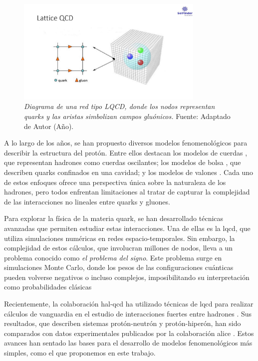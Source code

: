 \begin{figure}[h]
    \centering
    \includegraphics[width=0.8\textwidth]{./Images/LQCD.jpg}
    \caption[Red LQCD]{\emph{Diagrama de una red tipo LQCD, donde los nodos representan quarks y las aristas simbolizan campos gluónicos.} Fuente: Adaptado de Autor (Año).}
    \label{fig:LQCD }
\end{figure}

A lo largo de los años, se han propuesto diversos modelos fenomenológicos para describir la estructura del protón. Entre ellos destacan los modelos de cuerdas \cite{Artru1974, Andersson_1983}, que representan hadrones como cuerdas oscilantes; los modelos de bolsa \cite{AIHPA_1968__8_2_163_0,DeTar_1983}, que describen quarks confinados en una cavidad; y los modelos de valones \cite{Hwa_1981}. Cada uno de estos enfoques ofrece una perspectiva única sobre la naturaleza de los hadrones, pero todos enfrentan limitaciones al tratar de capturar la complejidad de las interacciones no lineales entre quarks y gluones.

Para explorar la física de la materia quark, se han desarrollado técnicas avanzadas que permiten estudiar estas interacciones. Una de ellas es la \acrfull{lqcd}, que utiliza simulaciones numéricas en redes espacio-temporales. Sin embargo, la complejidad de estos cálculos, que involucran millones de nodos, lleva a un problema conocido como \emph{el problema del signo}. Este problema surge en simulaciones Monte Carlo, donde los pesos de las configuraciones cuánticas pueden volverse negativos o incluso complejos, imposibilitando su interpretación como probabilidades clásicas %

Recientemente, la colaboración \acrfull{hal-qcd} ha utilizado técnicas de \acrshort{lqcd} para realizar cálculos de vanguardia en el estudio de interacciones fuertes entre hadrones \cite{Iritani_2019,Hatsuda_2017}. Sus resultados, que describen sistemas protón-neutrón y protón-hiperón, han sido comparados con datos experimentales publicados por la colaboración \acrfull{alice} \cite{Collaboration2020, Collaboration2021}. Estos avances han sentado las bases para el desarrollo de modelos fenomenológicos más simples, como el que proponemos en este trabajo.

